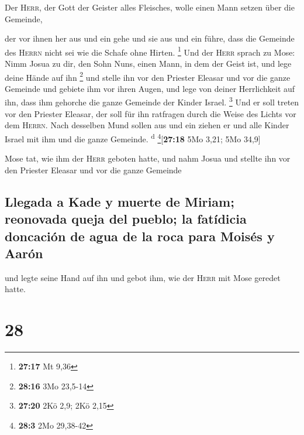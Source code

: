  Der \textsc{Herr}, der Gott der Geister alles Fleisches,
wolle einen Mann setzen über die Gemeinde,

 der vor ihnen her aus und ein gehe und sie aus und ein
führe, dass die Gemeinde des \textsc{Herrn} nicht sei wie die Schafe
ohne Hirten. \footnote{\textbf{27:17} Mt 9,36}  Und der
\textsc{Herr} sprach zu Mose: Nimm Josua zu dir, den Sohn Nuns, einen
Mann, in dem der Geist ist, und lege deine Hände auf ihn \footnote{\textbf{28:16}
  3Mo 23,5-14}  und stelle ihn vor den Priester Eleasar
und vor die ganze Gemeinde und gebiete ihm vor ihren Augen,
 und lege von deiner Herrlichkeit auf ihn, dass ihm
gehorche die ganze Gemeinde der Kinder Israel. \footnote{\textbf{27:20}
  2Kö 2,9; 2Kö 2,15}  Und er soll treten vor den Priester
Eleasar, der soll für ihn ratfragen durch die Weise des Lichts vor dem
\textsc{Herrn}. Nach desselben Mund sollen aus und ein ziehen er und
alle Kinder Israel mit ihm und die ganze Gemeinde. \textsuperscript{d}
\footnote{\textbf{28:3} 2Mo 29,38-42}{[}\textbf{27:18} 5Mo 3,21; 5Mo
34,9{]}

 Mose tat, wie ihm der \textsc{Herr} geboten hatte, und
nahm Josua und stellte ihn vor den Priester Eleasar und vor die ganze
Gemeinde

\hypertarget{llegada-a-kade-y-muerte-de-miriam-reonovada-queja-del-pueblo-la-fatuxeddicia-doncaciuxf3n-de-agua-de-la-roca-para-moisuxe9s-y-aaruxf3n}{%
\subsection{Llegada a Kade y muerte de Miriam; reonovada queja del
pueblo; la fatídicia doncación de agua de la roca para Moisés y
Aarón}\label{llegada-a-kade-y-muerte-de-miriam-reonovada-queja-del-pueblo-la-fatuxeddicia-doncaciuxf3n-de-agua-de-la-roca-para-moisuxe9s-y-aaruxf3n}}

 und legte seine Hand auf ihn und gebot ihm, wie der
\textsc{Herr} mit Mose geredet hatte.

\hypertarget{section-27}{%
\section{28}\label{section-27}}

